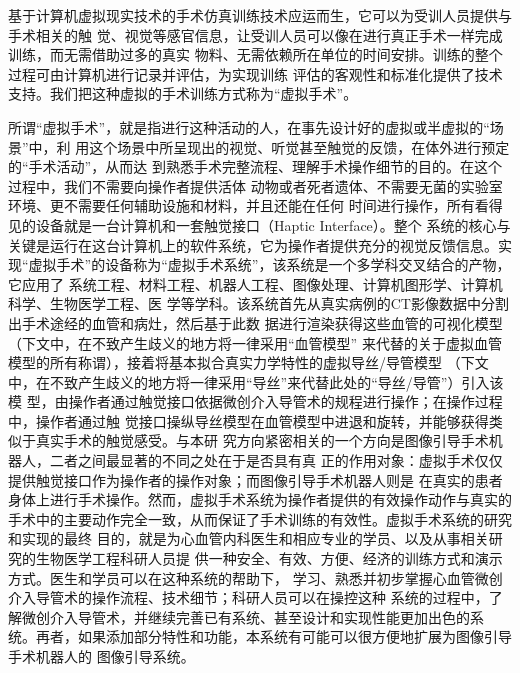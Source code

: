 基于计算机虚拟现实技术的手术仿真训练技术应运而生，它可以为受训人员提供与手术相关的触
觉、视觉等感官信息，让受训人员可以像在进行真正手术一样完成训练，而无需借助过多的真实
物料、无需依赖所在单位的时间安排。训练的整个过程可由计算机进行记录并评估，为实现训练
评估的客观性和标准化提供了技术支持。我们把这种虚拟的手术训练方式称为“虚拟手术”。


所谓“虚拟手术”，就是指进行这种活动的人，在事先设计好的虚拟或半虚拟的“场景”中，利
用这个场景中所呈现出的视觉、听觉甚至触觉的反馈，在体外进行预定的“手术活动”，从而达
到熟悉手术完整流程、理解手术操作细节的目的。在这个过程中，我们不需要向操作者提供活体
动物或者死者遗体、不需要无菌的实验室环境、更不需要任何辅助设施和材料，并且还能在任何
时间进行操作，所有看得见的设备就是一台计算机和一套触觉接口（Haptic Interface）。整个
系统的核心与关键是运行在这台计算机上的软件系统，它为操作者提供充分的视觉反馈信息。实
现“虚拟手术”的设备称为“虚拟手术系统”，该系统是一个多学科交叉结合的产物，它应用了
系统工程、材料工程、机器人工程、图像处理、计算机图形学、计算机科学、生物医学工程、医
学等学科。该系统首先从真实病例的CT影像数据中分割出手术途经的血管和病灶，然后基于此数
据进行渲染获得这些血管的可视化模型（下文中，在不致产生歧义的地方将一律采用“血管模型”
来代替的关于虚拟血管模型的所有称谓），接着将基本拟合真实力学特性的虚拟导丝/导管模型
（下文中，在不致产生歧义的地方将一律采用“导丝”来代替此处的“导丝/导管”）引入该模
型，由操作者通过触觉接口依据微创介入导管术的规程进行操作；在操作过程中，操作者通过触
觉接口操纵导丝模型在血管模型中进退和旋转，并能够获得类似于真实手术的触觉感受。与本研
究方向紧密相关的一个方向是图像引导手术机器人，二者之间最显著的不同之处在于是否具有真
正的作用对象：虚拟手术仅仅提供触觉接口作为操作者的操作对象；而图像引导手术机器人则是
在真实的患者身体上进行手术操作。然而，虚拟手术系统为操作者提供的有效操作动作与真实的
手术中的主要动作完全一致，从而保证了手术训练的有效性。虚拟手术系统的研究和实现的最终
目的，就是为心血管内科医生和相应专业的学员、以及从事相关研究的生物医学工程科研人员提
供一种安全、有效、方便、经济的训练方式和演示方式。医生和学员可以在这种系统的帮助下，
学习、熟悉并初步掌握心血管微创介入导管术的操作流程、技术细节；科研人员可以在操控这种
系统的过程中，了解微创介入导管术，并继续完善已有系统、甚至设计和实现性能更加出色的系
统。再者，如果添加部分特性和功能，本系统有可能可以很方便地扩展为图像引导手术机器人的
图像引导系统。

